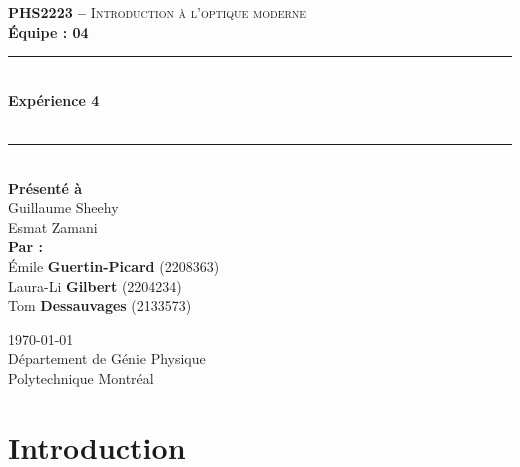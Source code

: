 \documentclass[11pt,letterpaper]{article}
\begin{document}
\begin{titlepage}
\center

\begin{figure}
\end{figure}
\vspace*{2 cm}

\textsc{\Large \textbf{PHS2223 --} Introduction à l'optique moderne}\\[0.5cm]
\large{\textbf{Équipe : 04}}\\[1.5cm]

\rule{\linewidth}{0.5mm} \\[0.5cm]
\Large{\textbf{Expérience 4}} \\[0.2cm]
\\
\rule{\linewidth}{0.2mm} \\[2.3cm]

\large{\textbf{Présenté à}\\
  Guillaume Sheehy\\
  Esmat Zamani\\[2.5cm]
  \textbf{Par :}\\
  Émile \textbf{Guertin-Picard} (2208363)\\
  Laura-Li \textbf{Gilbert} (2204234)\\
  Tom \textbf{Dessauvages} (2133573)\\[3cm]}

\large{\today\\
Département de Génie Physique\\
Polytechnique Montréal\\}

\end{titlepage}


\tableofcontents
{}
\newpage

\pagestyle{fancy}
\setlength{\headheight}{14pt}
\renewcommand{\headrulewidth}{0pt}
\fancyfoot[R]{\thepage}

\pagestyle{fancy}
\fancyhf{}
\renewcommand{\headrulewidth}{1pt}
\fancyhead[R]{\today}
\fancyfoot[R]{\thepage}

\setcounter{page}{1}


\section{Introduction}
\end{document}
